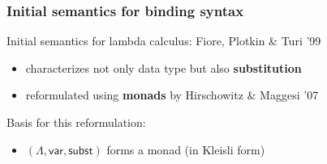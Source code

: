 \documentclass[
]
{beamer}
\newcommand{\constfont}[1]{\ensuremath{\mathsf{#1}}}
\newcommand{\subst}{\constfont{subst}}
\newcommand{\Var}{\constfont{var}}
\newcommand{\LC}{{\Lambda}}
\newcommand{\fat}[1]{\textbf{#1}}
\begin{document}
\begin{frame}
 \frametitle{Initial semantics for binding syntax}
    
    \begin{block}{Initial semantics for lambda calculus: Fiore, Plotkin \& Turi '99}
      \begin{itemize}
       \item characterizes not only data type but also \fat{substitution} %
       \item reformulated using \fat{monads} by Hirschowitz \& Maggesi '07
      \end{itemize}
    \end{block}

  Basis for this reformulation:
    
    \begin{lemma}
       \begin{itemize}
         \item [] $(\LC, \Var, \subst)$ forms a monad (in Kleisli form)
       \end{itemize}

    \end{lemma}

    
%     

\end{frame}
\end{document}
